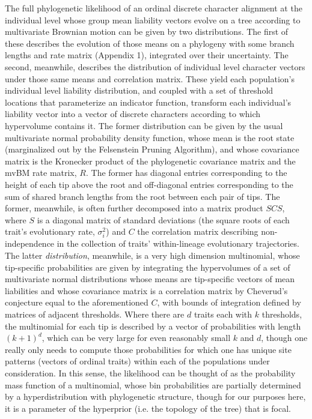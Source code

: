 \documentclass[10pt, twocolumn, twoside]{article}
\begin{document}
The full phylogenetic likelihood of an ordinal discrete character alignment at the individual level whose group mean liability vectors evolve on a tree according to multivariate Brownian motion can be given by two distributions. The first of these describes the evolution of those means on a phylogeny with some branch lengths and rate matrix (Appendix 1), integrated over their uncertainty. The second, meanwhile, describes the distribution of individual level character vectors under those same means and correlation matrix. These yield each population's individual level liability distribution, and coupled with a set of threshold locations that parameterize an indicator function, transform each individual's liability vector into a vector of discrete characters according to which hypervolume contains it. The former distribution can be given by the usual multivariate normal probability density function, whose mean is the root state (marginalized out by the Felsenstein Pruning Algorithm), and whose covariance matrix is the Kronecker product of the phylogenetic covariance matrix and the mvBM rate matrix, $R$. The former has diagonal entries corresponding to the height of each tip above the root and off-diagonal entries corresponding to the sum of shared branch lengths from the root between each pair of tips. The former, meanwhile, is often further  decomposed into a matrix product $SCS$, where $S$ is a diagonal matrix of standard deviations (the square roots of each trait's evolutionary rate, $\sigma^2_i$) and $C$ the correlation matrix describing non-independence in the collection of traits' within-lineage evolutionary trajectories. The latter \textit{distribution}, meanwhile, is a very high dimension multinomial, whose tip-specific probabilities are given by integrating the hypervolumes of a set of multivariate normal distributions whose means are tip-specific vectors of mean liabilities and whose covariance matrix is a correlation matrix by Cheverud's conjecture equal to the aforementioned $C$, with bounds of integration defined by matrices of adjacent thresholds. Where there are $d$ traits each with $k$ thresholds, the multinomial for each tip is described by a vector of probabilities with length $(k+1)^d$, which can be very large for even reasonably small $k$ and $d$, though one really only needs to compute those probabilities for which one has unique site patterns (vectors of ordinal traits) within each of the populations under consideration. In this sense, the likelihood can be thought of as the probability mass function of a multinomial, whose bin probabilities are partially determined by a hyperdistribution with phylogenetic structure, though for our purposes here, it is a parameter of the hyperprior (i.e. the topology of the tree) that is focal. 
\end{document}
